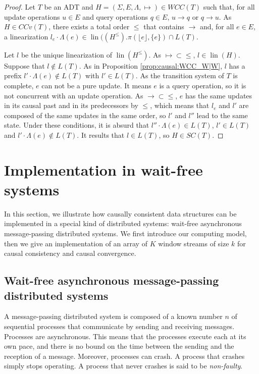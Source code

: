 \documentclass[9pt,numbers]{sigplanconf}
\DeclareMathOperator{\lin}{lin}
\begin{document}
\begin{proof}
  Let $T$ be an ADT and $H = (\Sigma, E, \Lambda, \mapsto) \in WCC(T)$ such that, for all update operations $u \in E$
  and query operations $q \in E$, $u\rightarrow q$ or $q\rightarrow u$. As $H\in CCv(T)$, there exists a total order $\le$ 
  that contains $\rightarrow$ and, for all $e\in E$, a linearization 
  $l_e\cdot\Lambda(e) \in \lin((H^\le).\pi(\lfloor e\rfloor, \{e\})\cap L(T)$.

  Let $l$ be the unique linearization of $\lin(H^\le)$. As $\mapsto \subset \le$, $l\in \lin(H)$. 
  Suppose that $l\notin L(T)$. As in Proposition \ref{prop:causal:WCC_W|W},
  $l$ has a prefix $l'\cdot\Lambda(e) \notin L(T)$ with $l'\in L(T)$. 
  As the transition system of $T$ is complete, $e$ can not be a pure update.
  It means $e$ is a query operation, so it is not concurrent with an update operation. 
  As $\rightarrow\subset\le$, $e$ has the same updates in its causal past and in its 
  predecessors by $\le$, which means that $l_e$ and $l'$ are composed of the same 
  updates in the same order, so $l'$ and $l''$ lead to the same state. 
  Under these conditions, it is absurd that $l''\cdot\Lambda(e) \in L(T)$,
  $l' \in L(T)$ and $l'\cdot\Lambda(e) \notin L(T)$. It results that $l\in L(T)$, so $H\in SC(T)$.
\end{proof}

\section{Implementation in wait-free systems}\label{section:implementation}


In this section, we illustrate how causally consistent data structures can be implemented 
in a special kind of distributed systems: wait-free asynchronous message-passing distributed systems.
We first introduce our computing model, then we give an implementation of an array of $K$ 
window streams of size $k$ for causal consistency and causal convergence. 

\subsection{Wait-free asynchronous message-passing distributed systems}

A message-passing distributed system is composed of a known number $n$ of sequential processes
that communicate by sending and receiving messages. Processes are asynchronous.
This means that the processes execute each at its own pace, and there is no bound on the time between 
the sending and the reception of a message. Moreover, processes can crash. A process that crashes 
simply stops operating. A process that never crashes is said to be \emph{non-faulty}.
\end{document}
